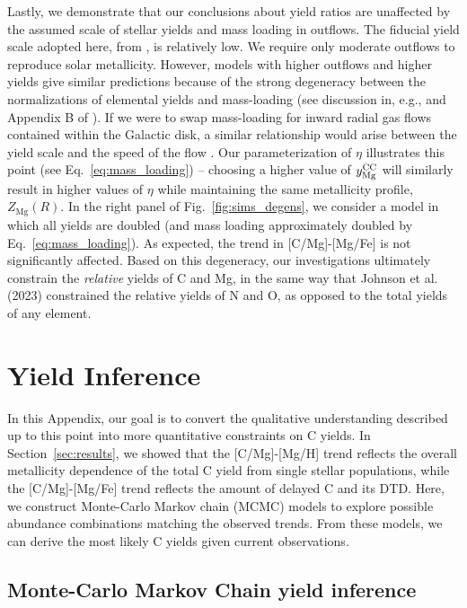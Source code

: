 \documentclass[fleqn,
usenatbib]{mnras}
\newcommand{\caah}{[C/Mg]-[Mg/H]}
\newcommand{\caafe}{[C/Mg]-[Mg/Fe]}
\begin{document}
{Lastly, we demonstrate that our conclusions about yield ratios are unaffected by the assumed scale of stellar yields and mass loading in outflows.
The fiducial yield scale adopted here, from \citet{david_fe}, is relatively low. We require only moderate outflows to reproduce solar metallicity. However, models with higher outflows and higher yields give similar predictions because of the 
strong degeneracy between the normalizations of elemental yields and mass-loading (see discussion in, e.g., \citealt{sandford+24} and Appendix B of \citealt{james+23}). 
If we were to swap mass-loading for inward radial gas flows contained within the Galactic disk, a similar relationship would arise between the yield scale and the speed of the flow \citep{james+25}.
Our parameterization of $\eta$ illustrates this point (see Eq.~\ref{eq:mass_loading}) -- choosing a higher value of $y_{\rm Mg}^{\rm CC}$ will similarly result in higher values of $\eta$ while maintaining the same metallicity profile, $Z_\text{Mg}(R)$. 
In the right panel of Fig.~\ref{fig:sims_degens}, we consider a model in which all yields are doubled (and mass loading approximately doubled by Eq.~\ref{eq:mass_loading}). As expected, the trend in [C/Mg]-[Mg/Fe] is not significantly affected. Based on this degeneracy, our investigations ultimately constrain the \textit{relative} yields of C and Mg, in the same way that Johnson et al. (2023) constrained the relative yields of N and O, as opposed to the total yields of any element.






\section{Yield Inference} \label{sec:extra_mcmc}

In this Appendix, our goal is to convert the qualitative understanding described up to this point into more quantitative constraints on C yields. 
In Section~\ref{sec:results}, we showed that the \caah{} trend reflects the overall metallicity dependence of the total C yield from single stellar populations, while the \caafe{} trend reflects the amount of delayed C and its DTD. Here, we construct Monte-Carlo Markov chain (MCMC) models to explore possible abundance combinations matching the observed trends. From these models, we can derive the most likely C yields given current observations.

\subsection{Monte-Carlo Markov Chain yield inference} \label{sec:mcmc_methods}


}
\end{document}
